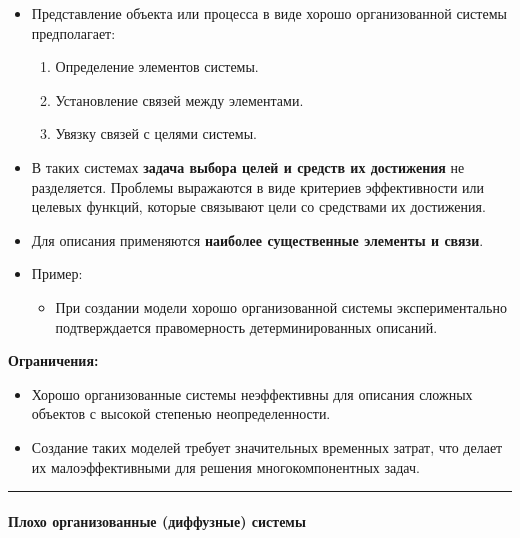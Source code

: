 \documentclass[
]{article}
\providecommand{\tightlist}{%
  \setlength{\itemsep}{0pt}\setlength{\parskip}{0pt}}
\begin{document}
\begin{itemize}
\item
  Представление объекта или процесса в виде хорошо организованной
  системы предполагает:

  \begin{enumerate}
  \def\labelenumi{\arabic{enumi}.}
  \tightlist
  \item
    Определение элементов системы.
  \item
    Установление связей между элементами.
  \item
    Увязку связей с целями системы.
  \end{enumerate}
\item
  В таких системах \textbf{задача выбора целей и средств их достижения}
  не разделяется. Проблемы выражаются в виде критериев эффективности или
  целевых функций, которые связывают цели со средствами их достижения.
\item
  Для описания применяются \textbf{наиболее существенные элементы и
  связи}.
\item
  Пример:

  \begin{itemize}
  \tightlist
  \item
    При создании модели хорошо организованной системы экспериментально
    подтверждается правомерность детерминированных описаний.
  \end{itemize}
\end{itemize}

\textbf{Ограничения:}

\begin{itemize}
\tightlist
\item
  Хорошо организованные системы неэффективны для описания сложных
  объектов с высокой степенью неопределенности.
\item
  Создание таких моделей требует значительных временных затрат, что
  делает их малоэффективными для решения многокомпонентных задач.
\end{itemize}

\begin{center}\rule{0.5\linewidth}{0.5pt}\end{center}

\paragraph{\texorpdfstring{\textbf{Плохо организованные (диффузные)
системы}}{Плохо организованные (диффузные) системы}}\label{ux43fux43bux43eux445ux43e-ux43eux440ux433ux430ux43dux438ux437ux43eux432ux430ux43dux43dux44bux435-ux434ux438ux444ux444ux443ux437ux43dux44bux435-ux441ux438ux441ux442ux435ux43cux44b}
\end{document}
